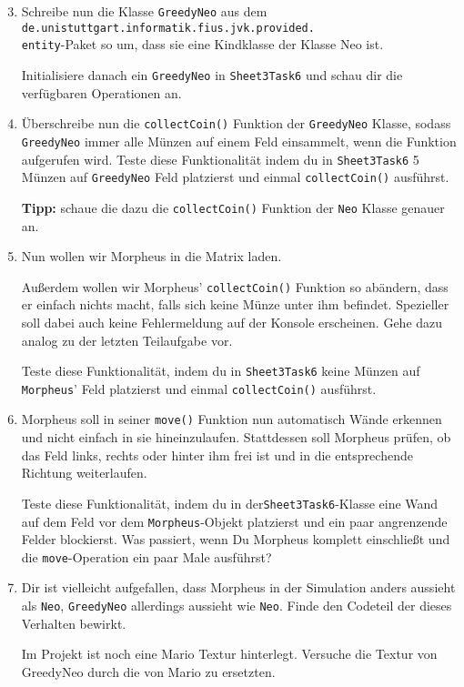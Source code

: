 \begin{enumerate}\setcounter{enumi}{2}
\item Schreibe nun die Klasse \lstinline{GreedyNeo} aus dem \texttt{de.unistuttgart.informatik.fius.jvk.provided.}\\\texttt{entity}-Paket so um, dass sie eine Kindklasse der Klasse Neo ist.

Initialisiere danach ein \lstinline{GreedyNeo} in \lstinline{Sheet3Task6} und schau dir die verfügbaren Operationen an.

\item Überschreibe nun die \lstinline{collectCoin()} Funktion der \lstinline{GreedyNeo} Klasse, sodass \lstinline{GreedyNeo} immer alle Münzen auf einem Feld einsammelt, wenn die Funktion aufgerufen wird.
Teste diese Funktionalität indem du in \lstinline{Sheet3Task6} 5 Münzen auf \lstinline{GreedyNeo} Feld platzierst und einmal \lstinline{collectCoin()} ausführst.

\textbf{Tipp:} schaue die dazu die \lstinline{collectCoin()} Funktion der \lstinline{Neo} Klasse genauer an.

\item Nun wollen wir Morpheus in die Matrix laden.

Außerdem wollen wir Morpheus' \lstinline{collectCoin()} Funktion so abändern, dass er einfach nichts macht, falls sich keine Münze unter ihm befindet.
Spezieller soll dabei auch keine Fehlermeldung auf der Konsole erscheinen.
Gehe dazu analog zu der letzten Teilaufgabe vor.

Teste diese Funktionalität, indem du in \lstinline{Sheet3Task6} keine Münzen auf \lstinline{Morpheus}' Feld platzierst und einmal \lstinline{collectCoin()} ausführst.

\item Morpheus soll in seiner \lstinline{move()} Funktion nun automatisch Wände erkennen und nicht einfach in sie hineinzulaufen.
Stattdessen soll Morpheus prüfen, ob das Feld links, rechts oder hinter ihm frei ist und in die entsprechende Richtung weiterlaufen.

Teste diese Funktionalität, indem du in der\lstinline{Sheet3Task6}-Klasse eine Wand auf dem Feld vor dem \lstinline{Morpheus}-Objekt platzierst und ein paar angrenzende Felder blockierst.
Was passiert, wenn Du Morpheus komplett einschließt und die \lstinline{move}-Operation ein paar Male ausführst?

\item \optional Dir ist vielleicht aufgefallen, dass Morpheus in der Simulation anders aussieht als \lstinline{Neo}, \lstinline{GreedyNeo} allerdings aussieht wie \lstinline{Neo}.
Finde den Codeteil der dieses Verhalten bewirkt.

Im Projekt ist noch eine Mario Textur hinterlegt.
Versuche die Textur von GreedyNeo durch die von Mario zu ersetzten.

\end{enumerate}

